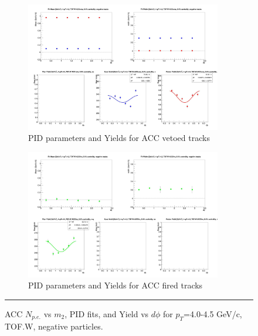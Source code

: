 \begin{figure}[H]
  \ContinuedFloat
    \vspace*{-1cm}
    \begin{subfigure}{1\textwidth}
   \centering
   \includegraphics[width=0.94\textwidth]{hiptfits/neg/fitParams_tof2_cent0_ch0_pT-40-45.jpg}
    \caption{PID parameters and Yields for ACC vetoed tracks}
    \end{subfigure}    
    \begin{subfigure}{1\textwidth}
   \centering
   \includegraphics[width=0.94\textwidth]{hiptfits/neg/fitParams_tof3_cent0_ch0_pT-40-45.jpg}
    \caption{PID parameters and Yields for ACC fired tracks}
    \end{subfigure} 
    \rule{35em}{0.5pt}
  \caption[ACC $N_{p.e.}$ vs $m_2$, PID fits, and Yield vs $d\phi$ for $p_T$=4.0-4.5 GeV/c, TOF.W, negative particles.]{ACC $N_{p.e.}$ vs $m_2$, PID fits, and Yield vs $d\phi$ for $p_T$=4.0-4.5 GeV/c, TOF.W, negative particles.}
  \label{fig:acc40-45neg}
\end{figure}


